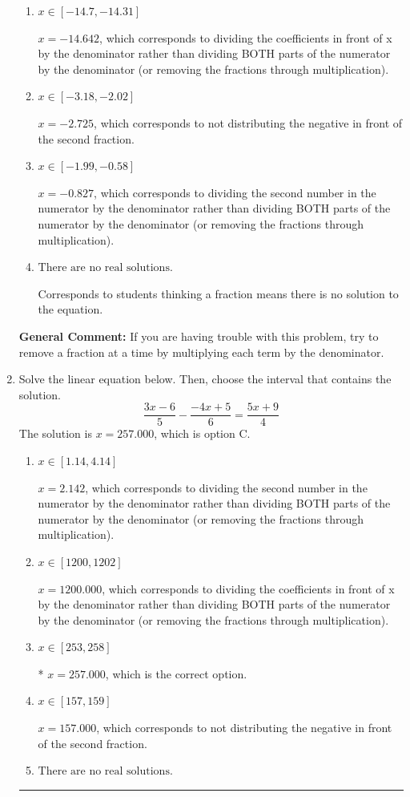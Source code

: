 \documentclass{extbook}[14pt]
\newcommand{\litem}[1]{\item #1

\rule{\textwidth}{0.4pt}}
\begin{document}
\begin{enumerate}
{\begin{enumerate}[label=\Alph*.]
* $x = -3.826$, which is the correct option.
\item \( x \in [-14.7, -14.31] \)

 $x = -14.642$, which corresponds to dividing the coefficients in front of x by the denominator rather than dividing BOTH parts of the numerator by the denominator (or removing the fractions through multiplication).
\item \( x \in [-3.18, -2.02] \)

 $x = -2.725$, which corresponds to not distributing the negative in front of the second fraction.
\item \( x \in [-1.99, -0.58] \)

 $x = -0.827$, which corresponds to dividing the second number in the numerator by the denominator rather than dividing BOTH parts of the numerator by the denominator (or removing the fractions through multiplication).
\item \( \text{There are no real solutions.} \)

Corresponds to students thinking a fraction means there is no solution to the equation.
\end{enumerate}

\textbf{General Comment:} If you are having trouble with this problem, try to remove a fraction at a time by multiplying each term by the denominator.
}
\litem{
Solve the linear equation below. Then, choose the interval that contains the solution.
\[ \frac{3x -6}{5} - \frac{-4x + 5}{6} = \frac{5x + 9}{4} \]The solution is \( x = 257.000 \), which is option C.\begin{enumerate}[label=\Alph*.]
\item \( x \in [1.14, 4.14] \)

 $x = 2.142$, which corresponds to dividing the second number in the numerator by the denominator rather than dividing BOTH parts of the numerator by the denominator (or removing the fractions through multiplication).
\item \( x \in [1200, 1202] \)

 $x = 1200.000$, which corresponds to dividing the coefficients in front of x by the denominator rather than dividing BOTH parts of the numerator by the denominator (or removing the fractions through multiplication).
\item \( x \in [253, 258] \)

* $x = 257.000$, which is the correct option.
\item \( x \in [157, 159] \)

 $x = 157.000$, which corresponds to not distributing the negative in front of the second fraction.
\item \( \text{There are no real solutions.} \)


\end{enumerate}}
\end{enumerate}
\end{document}
